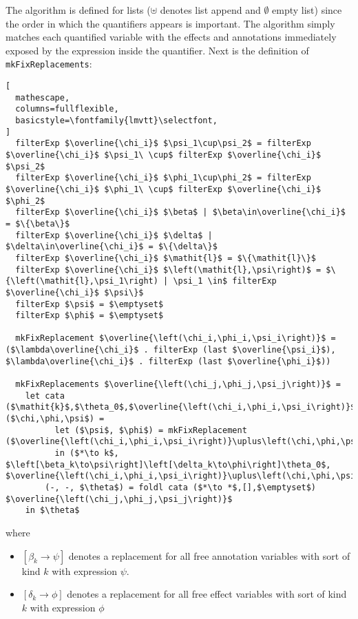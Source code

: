 \documentclass[8pt]{extarticle}
\begin{document}
The algorithm is defined for lists ($\uplus$ denotes list append and $\emptyset$ empty list) since the order in which the quantifiers appears is important. The algorithm simply matches each quantified variable with the effects and annotations immediately exposed by the expression inside the quantifier. Next is the definition of \verb+mkFixReplacements+:
\begin{lstlisting}[
  mathescape,
  columns=fullflexible,
  basicstyle=\fontfamily{lmvtt}\selectfont,
]
  filterExp $\overline{\chi_i}$ $\psi_1\cup\psi_2$ = filterExp $\overline{\chi_i}$ $\psi_1\ \cup$ filterExp $\overline{\chi_i}$ $\psi_2$
  filterExp $\overline{\chi_i}$ $\phi_1\cup\phi_2$ = filterExp $\overline{\chi_i}$ $\phi_1\ \cup$ filterExp $\overline{\chi_i}$ $\phi_2$
  filterExp $\overline{\chi_i}$ $\beta$ | $\beta\in\overline{\chi_i}$ = $\{\beta\}$
  filterExp $\overline{\chi_i}$ $\delta$ | $\delta\in\overline{\chi_i}$ = $\{\delta\}$
  filterExp $\overline{\chi_i}$ $\mathit{l}$ = $\{\mathit{l}\}$
  filterExp $\overline{\chi_i}$ $\left(\mathit{l},\psi\right)$ = $\{\left(\mathit{l},\psi_1\right) | \psi_1 \in$ filterExp $\overline{\chi_i}$ $\psi\}$
  filterExp $\psi$ = $\emptyset$
  filterExp $\phi$ = $\emptyset$

  mkFixReplacement $\overline{\left(\chi_i,\phi_i,\psi_i\right)}$ = ($\lambda\overline{\chi_i}$ . filterExp (last $\overline{\psi_i}$), $\lambda\overline{\chi_i}$ . filterExp (last $\overline{\phi_i}$))

  mkFixReplacements $\overline{\left(\chi_j,\phi_j,\psi_j\right)}$ = 
    let cata ($\mathit{k}$,$\theta_0$,$\overline{\left(\chi_i,\phi_i,\psi_i\right)}$) ($\chi,\phi,\psi$) =
          let ($\psi$, $\phi$) = mkFixReplacement ($\overline{\left(\chi_i,\phi_i,\psi_i\right)}\uplus\left(\chi,\phi,\psi\right)$) 
          in ($*\to k$, $\left[\beta_k\to\psi\right]\left[\delta_k\to\phi\right]\theta_0$, $\overline{\left(\chi_i,\phi_i,\psi_i\right)}\uplus\left(\chi,\phi,\psi\right)$)
        (-, -, $\theta$) = foldl cata ($*\to *$,[],$\emptyset$) $\overline{\left(\chi_j,\phi_j,\psi_j\right)}$
    in $\theta$
\end{lstlisting}
where
\begin{itemize}
\item $\left[\beta_k\to\psi\right]$ denotes a replacement for all free annotation variables with sort of kind $k$ with expression $\psi$.
\item $\left[\delta_k\to\phi\right]$  denotes a replacement for all free effect variables with sort of kind $k$ with expression $\phi$
\end{itemize}
\end{document}
